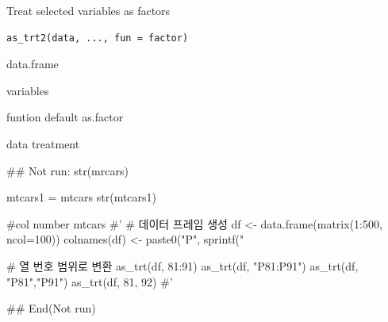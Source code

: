 \documentclass[a4paper]{book}
\begin{document}
%
\begin{Description}
Treat selected variables as factors
\end{Description}
%
\begin{Usage}
\begin{verbatim}
as_trt2(data, ..., fun = factor)
\end{verbatim}
\end{Usage}
%
\begin{Arguments}
\begin{ldescription}
\item[\code{data}] data.frame

\item[\code{...}] variables

\item[\code{fun}] funtion default as.factor
\end{ldescription}
\end{Arguments}
%
\begin{Value}
data treatment
\end{Value}
%
\begin{Examples}
\begin{ExampleCode}
\#\# Not run: 
 str(mrcars)

 mtcars1 = mtcars %
 str(mtcars1)

 #col number
 mtcars%
#'
# 데이터 프레임 생성
df <- data.frame(matrix(1:500, ncol=100))
colnames(df) <- paste0("P", sprintf("%

# 열 번호 범위로 변환
as_trt(df, 81:91)%
as_trt(df, "P81:P91")%
as_trt(df, "P81","P91")%
as_trt(df, 81, 92)%
#'



## End(Not run)

\end{ExampleCode}
\end{Examples}
\end{document}
